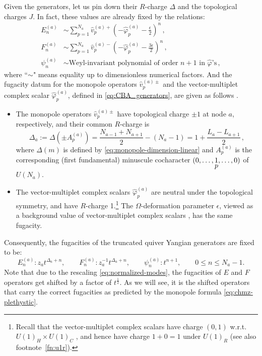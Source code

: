 \documentclass[12pt,a4paper]{article}
\newcommand{\eps}{\epsilon}
\begin{document}
Given the generators, let us pin down their $R$-charge $\Delta$ and the topological charges $J$. In fact, these values are already fixed by the relations:
\begin{equation}
    \begin{aligned}
        E^{(a)}_n &\sim \sum_{p=1}^{N_a} \hat{v}^{(a)+}_p(-\hat{\varphi}^{(a)}_p-\frac{\eps}{2})^n\,,\\
        F^{(a)}_n &\sim \sum_{p=1}^{N_a} \hat{v}^{(a)-}_p(-\hat{\varphi}^{(a)}_p-\frac{3\eps}{2})^n\,,\\
        \psi^{(a)}_n&\sim \text{Weyl-invariant polynomial of order $n+1$ in $\hat{\varphi}$'s}\,,
    \end{aligned}
\end{equation}
where ``$\sim$" means equality up to dimensionless numerical factors.
And the fugacity datum for the monopole operators $\hat{v}^{(a)\pm}_p$ and the vector-multiplet complex scalar $\hat{\varphi}^{(a)}_p$, defined in \eqref{eq:CBA_generators}, are given as follows \cite{CremonesiHananyZaffaroni2014}.
\begin{itemize}
    \item The monopole operators $\hat{v}^{(a)\pm}_p$ have topological charge $\pm 1$ at node $a$, respectively, and their common $R$-charge is
    \begin{equation}
 \Delta_a:=\Delta(\pm A^{(a)}_p)=\frac{N_{a-1}+N_{a+1}}{2}-(N_a-1)
 =1+\frac{L_a-L_{a+1}}{2}\,,
 \label{eq:minuscule-dimension}
\end{equation}
where $\Delta(m)$ is defined by \eqref{eq:monopole-dimension-linear} and $A^{(a)}_p$ is the corresponding (first fundamental) minuscule cocharacter $(0,\dots, \stackunder{$1$}{$p$},\dots,0)$ of $U(N_a)$.

\item The vector-multiplet complex scalars $\hat{\varphi}^{(a)}_p$ are neutral under the topological symmetry, and have $R$-charge 1.\footnote{Recall that the vector-multiplet complex scalars have charge $(0,1)$ w.r.t.\ $U(1)_H\times U(1)_C$ \cite{BullimoreEtAl2016,ChenLi2026}, and hence have charge $1+0=1$ under $U(1)_R$ (see also footnote~\ref{fn:u1r}).} The $\Omega$-deformation parameter $\eps$, viewed as a background value of vector-multiplet complex scalars \cite{BullimoreEtAl2018}, has the same fugacity.
\end{itemize}
Consequently, the fugacities of the truncated quiver Yangian generators are fixed to be:
\begin{equation}
 E_n^{(a)}:z_a t^{\Delta_a+n},\qquad
 F_n^{(a)}:z_a^{-1}t^{\Delta_a+n},\qquad
 \psi_n^{(a)}:t^{n+1},
 \qquad 0\leq n\leq N_a-1.
 \label{eq:sec31-fugacities}
\end{equation}
Note that due to the rescaling \eqref{eq:normalized-modes}, the fugacities of $E$ and $F$ operators get shifted by a factor of $t^{\frac 1 2}$. As we will see, it is the shifted operators that carry the correct fugacities as predicted by the monopole formula \eqref{eq:chmz-plethystic}.
\end{document}
